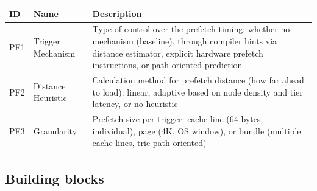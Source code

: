 \begin{scriptsize}
\begin{longtable}{@{}>{\raggedright\arraybackslash}p{1.8cm} >{\raggedright\arraybackslash}p{3.2cm} >{\raggedright\arraybackslash}p{8.5cm}@{}}
\toprule
ID & Name & Description \\
\midrule
\endhead%
PF1 & Trigger Mechanism & Type of control over the prefetch timing: whether no mechanism (baseline), through compiler hints via distance estimator, explicit hardware prefetch instructions, or path-oriented prediction \\
PF2 & Distance Heuristic & Calculation method for prefetch distance (how far ahead to load): linear, adaptive based on node density and tier latency, or no heuristic \\
PF3 & Granularity & Prefetch size per trigger: cache-line (64 bytes, individual), page (4\allowbreak{}K, OS window), or bundle (multiple cache-lines, trie-path-oriented) \\
\bottomrule
\end{longtable}
\end{scriptsize}

\subsection*{Building blocks}

